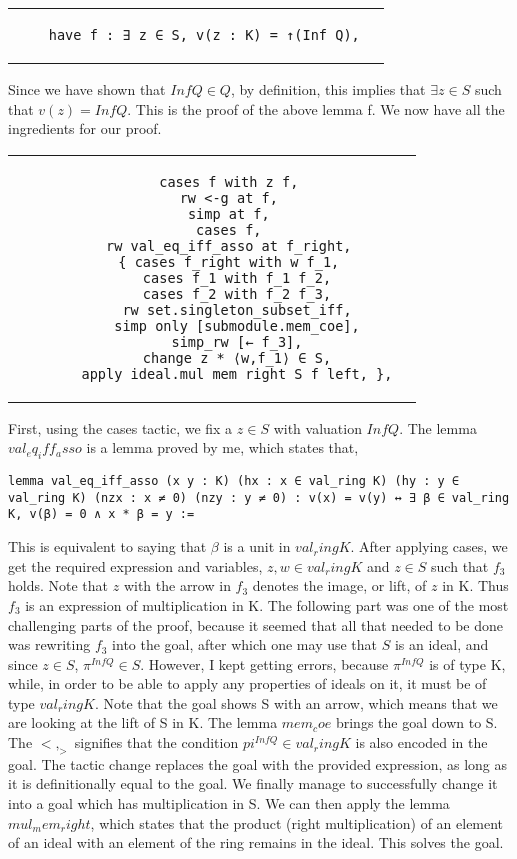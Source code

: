 \documentclass[10pt, a4paper]{article}
\begin{document}
\begin{tabular}{c|c}
    \begin{lstlisting}
    have f : ∃ z ∈ S, v(z : K) = ↑(Inf Q),
    \end{lstlisting} &   
\end{tabular}

Since we have shown that $Inf Q \in Q$, by definition, this implies that $\exists z \in S$ such that $v(z) = Inf Q$. This is the proof of the above lemma f. We now have all the ingredients for our proof. \\

\begin{tabular}{c|c}
    \begin{lstlisting}
      cases f with z f,
      rw <-g at f,
      simp at f,
      cases f,
      rw val_eq_iff_asso at f_right,
      { cases f_right with w f_1,
        cases f_1 with f_1 f_2,
        cases f_2 with f_2 f_3,
        rw set.singleton_subset_iff,
        simp only [submodule.mem_coe],
        simp_rw [← f_3],
        change z * ⟨w,f_1⟩ ∈ S,
        apply ideal.mul_mem_right S f_left, },
    \end{lstlisting} &  
\end{tabular}

First, using the cases tactic, we fix a $z \in S$ with valuation $Inf Q$. The lemma $val_eq_iff_asso$ is a lemma proved by me, which states that, 

\begin{lstlisting}
lemma val_eq_iff_asso (x y : K) (hx : x ∈ val_ring K) (hy : y ∈ val_ring K) (nzx : x ≠ 0) (nzy : y ≠ 0) : v(x) = v(y) ↔ ∃ β ∈ val_ring K, v(β) = 0 ∧ x * β = y :=
\end{lstlisting}

This is equivalent to saying that $\beta$ is a unit in $val_ring K$. After applying cases, we get the required expression and variables, $z,w \in val_ring K$ and $z \in S$ such that $f_3$ holds. Note that $z$ with the arrow in $f_3$ denotes the image, or lift, of $z$ in K. Thus $f_3$ is an expression of multiplication in K. The following part was one of the most challenging parts of the proof, because it seemed that all that needed to be done was rewriting $f_3$ into the goal, after which one may use that $S$ is an ideal, and since $z \in S$, $\pi^{Inf Q} \in S$. However, I kept getting errors, because $\pi^{Inf Q}$ is of type K, while, in order to be able to apply any properties of ideals on it, it must be of type $val_ring K$. Note that the goal shows S with an arrow, which means that we are looking at the lift of S in K. The lemma $mem_coe$ brings the goal down to S. The $< ,_>$ signifies that the condition $pi^{Inf Q} \in val_ring K$ is also encoded in the goal. The tactic change replaces the goal with the provided expression, as long as it is definitionally equal to the goal. We finally manage to successfully change it into a goal which has multiplication in S. We can then apply the lemma $mul_mem_right$, which states that the product (right multiplication) of an element of an ideal with an element of the ring remains in the ideal. This solves the goal. 
\end{document}
